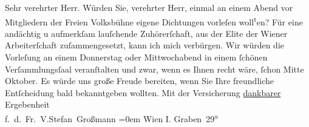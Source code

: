 \begin{ledgroupsized}[t]{13cm}
           \pstart{}Sehr verehrter Herr.\pend\pstart
           Würden Sie, verehrter Herr, einmal an einem Abend vor Mitgliedern der Freien Volksbühne eigene Dichtungen vorleſen woll\substVorne{}\textsuperscript{t}\substDazwischen{}e\substHinten{}n?\pend
           \pstart
           Für eine andächtig u aufmerkſam lauſchende Zuhörerſchaft, aus der Elite der Wiener Arbeiterſchaft zuſammengesetzt, kann ich
               mich verbürgen.\pend
           \pstart
           Wir würden die Vorleſung an einem Donnerstag oder Mittwochabend in einem ſchönen
               Verſammlungsſaal veranſtalten und zwar, wenn es Ihnen recht wäre, ſchon Mitte
               Oktober.\pend
           \pstart
            Es würde uns große Freude bereiten, wenn Sie
               Ihre freundliche Entſcheidung bald bekanntgeben wollten.\pend
           \pstart
           Mit der Versicherung \uline{dankbarer} Ergebenheit{\\[\baselineskip]}
                  f. d. Fr. V.\spacefill\mbox{Stefan Großmann}\pend
           \leftskip=0em{}\pstart
           \noindent{}Wien I. Graben 29\textsuperscript{a}\pend
           
         
         \endnumbering{}\end{ledgroupsized}  \newcommand{\dateiname}{L01711}\newcommand{\titel}{Stefan Großmann an Arthur Schnitzler, 27. 9. 1907}\newcommand{\editorInnen}{ Martin Anton Müller und Gerd-Hermann Susen}
      